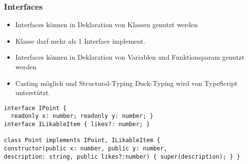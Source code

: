 \subsubsection{Interfaces}
\begin{itemize}
    \item Interfaces können in Deklaration von Klassen genutzt werden
    \item Klasse darf mehr als 1 Interface implement.
    \item Interfaces können in Deklaration von Variablen und Funktionsparam genutzt werden
    \item Casting möglich und Structural-Typing Duck-Typing wird von TypeScript unterstützt.
\end{itemize}
\begin{lstlisting}
interface IPoint {
  readonly x: number; readonly y: number; }
interface ILikableItem { likes?: number; }

class Point implements IPoint, ILikableItem {
constructor(public x: number, public y: number,
description: string, public likes?:number) { super(description); } }
\end{lstlisting}








\vfill
$ $

\columnbreak